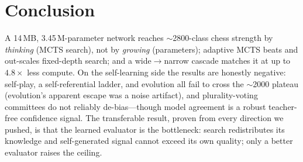 \documentclass[11pt]{article}
\begin{document}
\section{Conclusion}
A 14\,MB, 3.45\,M-parameter network reaches $\sim$2800-class chess strength by \emph{thinking} (MCTS
search), not by \emph{growing} (parameters); adaptive MCTS beats and out-scales fixed-depth search;
and a wide$\rightarrow$narrow cascade matches it at up to $4.8\times$ less compute. On the
self-learning side the results are honestly negative: self-play, a self-referential ladder, and
evolution all fail to cross the $\sim$2000 plateau (evolution's apparent escape was a noise
artifact), and plurality-voting committees do not reliably de-bias---though model agreement is a
robust teacher-free confidence signal. The transferable result, proven from every direction we
pushed, is that the learned evaluator is the bottleneck: search redistributes its knowledge and
self-generated signal cannot exceed its own quality; only a better evaluator raises the ceiling.



\end{document}
